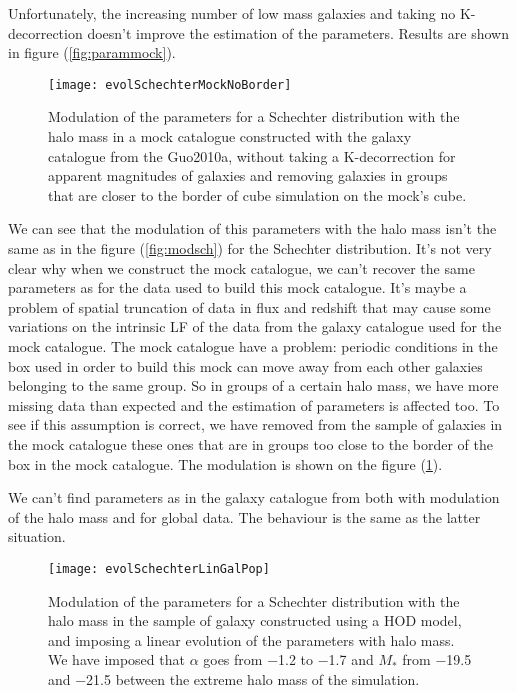 Unfortunately, the increasing number of low mass galaxies and taking no K-decorrection doesn't improve the estimation of the
parameters. Results are shown in figure (\ref{fig:parammock}).
\begin{figure}[htb]
	\centering
	\texttt{[image: evolSchechterMockNoBorder]}
	\caption{\footnotesize{}Modulation of the parameters for a Schechter distribution with the halo mass in a mock catalogue
	constructed with the galaxy catalogue from the Guo2010a, without taking a K-decorrection for apparent magnitudes of
	galaxies and removing galaxies in groups that are closer to the border of cube simulation on the mock's cube.}
	\label{fig:parammocknoborder}
\end{figure}

We can see that the modulation of this parameters with the halo mass isn't the same as in the figure (\ref{fig:modsch}) for the
Schechter distribution. It's not very clear why when we construct the mock catalogue, we can't recover the same parameters as for
the data used to build this mock catalogue. It's maybe a problem of spatial truncation of data in flux and redshift that may cause
some variations on the intrinsic LF of the data from the galaxy catalogue used for the mock catalogue. The mock catalogue have a
problem: periodic conditions in the box used in order to build this mock can move away from each other galaxies belonging to the
same group. So in groups of a certain halo mass, we have more missing data than expected and the estimation of parameters is
affected too. To see if this assumption is correct, we have removed from the sample of galaxies in the mock catalogue these ones
that are in groups too close to the border of the box in the mock catalogue. The modulation is shown on the figure
(\ref{fig:parammocknoborder}).

We can't find parameters as in the galaxy catalogue from \citet{Guo+11} both with modulation of the halo mass and for global data.
The behaviour is the same as the latter situation.
\begin{figure}[htb]
	\centering
	\texttt{[image: evolSchechterLinGalPop]}
	\caption{\footnotesize{}Modulation of the parameters for a Schechter distribution with the halo mass in the sample of galaxy
	constructed using a HOD model, and imposing a linear evolution of the parameters with halo mass. We have imposed that
	$\alpha$ goes from \num{-1.2} to \num{-1.7} and $M_*$ from \num{-19.5} and \num{-21.5} between the extreme halo mass of the
	simulation.}
	\label{fig:paramschlin}
\end{figure}

